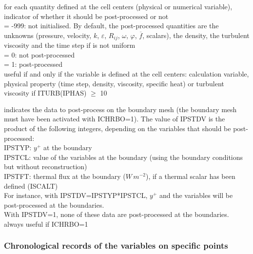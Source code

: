 {for each quantity defined at the cell centers (physical or numerical
variable), indicator of whether it should be post-processed or not \\
\hspace*{1.3cm}= -999: not initialised. By default, the post-processed
quantities are the unknowns (pressure, velocity, $k$, $\varepsilon$,
$R_{ij}$, $\omega$, $\varphi$, $\overline{f}$, scalars), the density,
the turbulent viscosity and the time step if is not uniform\\
\hspace*{1.3cm}= 0: not post-processed\\
\hspace*{1.3cm}= 1: post-processed\\
useful if and only if the variable is defined at the cell centers:
calculation variable, physical property (time step, density,
viscosity, specific heat) or turbulent viscosity if ITURB(IPHAS)
$\geqslant$ 10}

{indicates the data to post-process on the boundary mesh (the boundary mesh must
have been activated with ICHRBO=1). The value of IPSTDV is
the product of the following integers, depending on the variables that should be
post-processed:\\
\hspace*{1.3cm}IPSTYP: $y^+$ at the boundary\\
\hspace*{1.3cm}IPSTCL: value of the variables at the
boundary (using the boundary conditions but without reconstruction)\\
\hspace*{1.3cm}IPSTFT: thermal flux at the boundary
($W\,m^{-2}$), if a thermal scalar has been defined (ISCALT)\\
For instance, with IPSTDV=IPSTYP*IPSTCL, $y^+$ and the variables will be
post-processed at the boundaries.\\
With IPSTDV=1, none of these data are post-processed at the boundaries.\\
always useful if ICHRBO=1}

\subsubsection{Chronological records of the variables on specific points}

